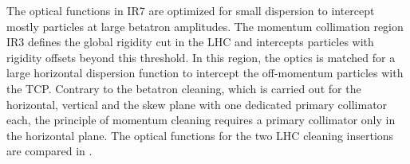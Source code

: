 The optical functions in IR7 are optimized for small dispersion to intercept mostly particles at large betatron amplitudes. The momentum collimation region IR3 defines the global rigidity cut in the LHC and intercepts particles with rigidity offsets beyond this threshold. In this region, the optics is matched for a large horizontal dispersion function to intercept the off-momentum particles with the TCP. Contrary to the betatron cleaning, which is carried out for the horizontal, vertical and the skew plane with one dedicated primary collimator each, the principle of momentum cleaning requires a primary collimator only in the horizontal plane. The optical functions for the two LHC cleaning insertions are compared in .  


\newpage


